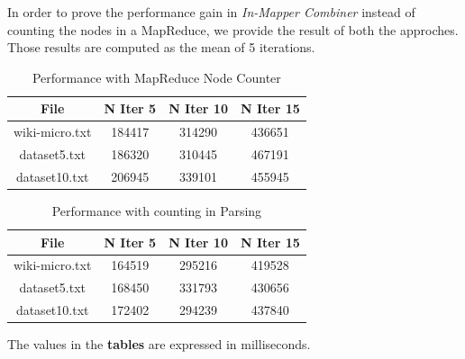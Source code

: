 \noindent In order to prove the performance gain in \textit{In-Mapper Combiner} instead of counting the nodes in a MapReduce, we provide the result of both the approches. Those results are computed as the mean of 5 iterations.

\begin{table}[H]
\caption{Performance with MapReduce Node Counter}
\centering
\begin{tabular}{c c c c}
\hline\hline
File & N Iter 5 & N Iter 10 & N Iter 15 \\ [0.7ex] %
\hline
wiki-micro.txt&184417&314290&436651\\
dataset5.txt&186320&310445&467191 \\
dataset10.txt&206945&339101&455945 \\ [1ex]
\hline
\end{tabular}
\label{table:nonlin}
\end{table}

\begin{table}[H]
\caption{Performance with counting in Parsing}
\centering
\begin{tabular}{c c c c}
\hline\hline
File & N Iter 5 & N Iter 10 & N Iter 15 \\ [0.7ex] %
\hline
wiki-micro.txt&164519&295216&419528\\
dataset5.txt&168450&331793&430656 \\
dataset10.txt&172402&294239&437840 \\ [1ex]
\hline
\end{tabular}
\label{table:nonlin}
\end{table}

\noindent The values in the \textbf{tables} are expressed in milliseconds.